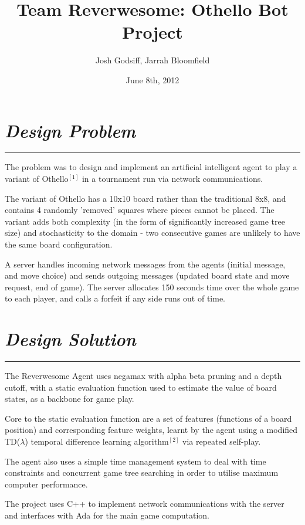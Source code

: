 \documentclass[10pt]{report}
\begin{document}
\date{June 8th, 2012}
\title{Team Reverwesome: Othello Bot Project}
\author{Josh Godsiff, Jarrah Bloomfield}
\maketitle

\setlength{\columnsep}{22.0pt}
\begin{multicols}{2}
\section*{\emph{Design Problem}}
\hrule

The problem was to design and implement an artificial intelligent agent to play a variant of Othello$^{[1]}$ in a tournament run via network communications.

The variant of Othello has a 10x10 board rather than the traditional 8x8, and contains 4 randomly 'removed' squares where pieces cannot be placed. The variant adds both complexity (in the form of significantly increased game tree size) and stochasticity to the domain - two consecutive games are unlikely to have the same board configuration.

A server handles incoming network messages from the agents (initial message, and move choice) and sends outgoing messages (updated board state and move request, end of game). The server allocates 150 seconds time over the whole game to each player, and calls a forfeit if any side runs out of time.
\section*{\emph{Design Solution}}
\hrule

The Reverwesome Agent uses negamax with alpha beta pruning and a depth cutoff, with a static evaluation function used to estimate the value of board states, as a backbone for game play.

Core to the static evaluation function are a set of features (functions of a board position) and corresponding feature weights, learnt by the agent using a modified TD($\lambda$) temporal difference learning algorithm$^{[2]}$ via repeated self-play.

The agent also uses a simple time management system to deal with time constraints and concurrent game tree searching in order to utilise maximum computer performance.

The project uses C++ to implement network communications with the server and interfaces with Ada for the main game computation.

\end{multicols}
\end{document}
